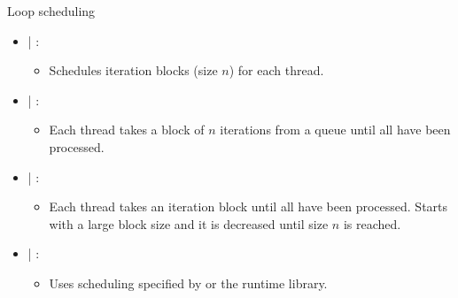 \begin{frame}[t]{Loop scheduling}
\begin{itemize}
  \item {} | :
    \begin{itemize}
      \item Schedules iteration blocks (size $n$) for each thread.
    \end{itemize}
  
  \item {} | :
    \begin{itemize}
      \item Each thread takes a block of $n$ iterations from a queue until all have been processed.
    \end{itemize}
  
  \item {} | :
    \begin{itemize}
      \item Each thread takes an iteration block until all have been processed. 
            Starts with a large block size and it is decreased until size $n$ is reached.
    \end{itemize}
  
  \item {} | :
    \begin{itemize}
      \item Uses scheduling specified by  or 
            the runtime library.
    \end{itemize}
  
\end{itemize}
\end{frame}
